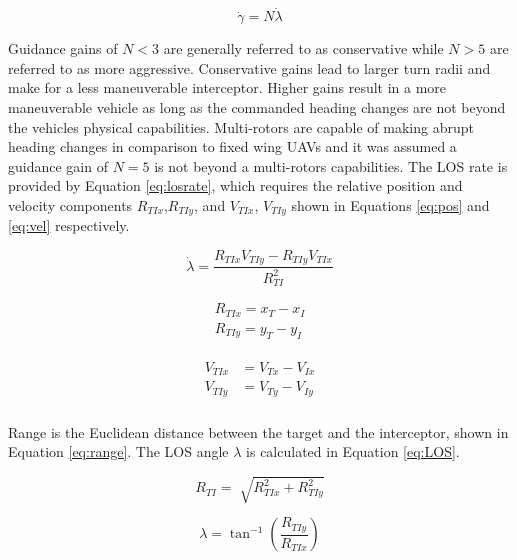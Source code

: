 \documentclass[conference]{IEEEtran}
\begin{document}
\begin{equation} \label{eq:PNlaw}
\dot{\gamma} = N\dot{\lambda}
\end{equation}

Guidance gains of $N < 3$ are generally referred to as conservative while $N > 5$ are referred to as more aggressive. Conservative gains lead to larger turn radii and make for a less maneuverable interceptor. Higher gains result in a more maneuverable vehicle as long as the commanded heading changes are not beyond the vehicles physical capabilities. Multi-rotors are capable of making abrupt heading changes in comparison to fixed wing UAVs and it was assumed a guidance gain of $N = 5$ is not beyond a multi-rotors capabilities. The LOS rate is provided by Equation \ref{eq:losrate}, which requires the relative position and velocity components $R_{TIx}$,$R_{TIy}$, and $V_{TIx}$, $V_{TIy}$ shown in Equations \ref{eq:pos} and \ref{eq:vel} respectively. 

\begin{equation} \label{eq:losrate}
\dot{\lambda} = \frac{R_{TIx}V_{TIy}-R_{TIy}V_{TIx}}{R_{TI}^2}
\end{equation}

\begin{equation} \label{eq:pos}
\begin{split}
R_{TIx} = x_T-x_I\\
R_{TIy} = y_T-y_I
\end{split}
\end{equation}

\begin{align}
\label{eq:vel}
\begin{split}
V_{TIx} &= V_{Tx}-V_{Ix}
\\
V_{TIy} &= V_{Ty}-V_{Iy}
\\
\end{split}
\end{align}

Range is the Euclidean distance between the target and the interceptor, shown in Equation \ref{eq:range}. The LOS angle $\lambda$ is calculated in Equation \ref{eq:LOS}. 

\begin{equation} \label{eq:range}
R_{TI} =\sqrt[]{R_{TIx}^2+R_{TIy}^2}
\end{equation}

\begin{equation} \label{eq:LOS}
\lambda = \tan^{-1} \left(\frac{R_{TIy}}{R_{TIx}}\right)
\end{equation}
\end{document}
